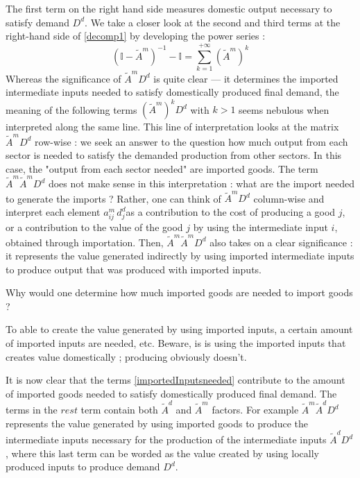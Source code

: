 \documentclass[12pt,english]{article}
\begin{document}
The first term on the right hand side measures domestic output necessary to satisfy demand $D^d$. We take a closer look at the second and third terms at the right-hand side of  \ref{decomp1} by developing the power series : 
\begin{equation}
(\mathbb{I} - \tilde{A}^m)^{-1} - \mathbb{I} = \sum_{k=1}^{+\infty}  (\tilde{A}^m)^k  \label{importedInputsneeded}
\end{equation}
Whereas the significance of $\tilde{A}^m D^d$ is quite clear --- it determines the imported intermediate inputs needed to satisfy domestically produced final demand, the meaning of the following terms $(\tilde{A}^m)^k D^d$ with $k>1$ seems nebulous when interpreted along the same line. This line of interpretation looks at the matrix $\tilde{A}^m D^d$ row-wise : we seek an answer to the question how much output from each sector is needed to satisfy the demanded production from other sectors. In this case, the "output from each sector needed" are imported goods. The term $\tilde{A}^m \tilde{A}^m D^d$ does not make sense in this interpretation : what are the import needed to generate the imports ? Rather, one can think of $\tilde{A}^m D^d$ column-wise and interpret each element $a^m_{ij}\,d^d_j$as a contribution to the cost of producing a good $j$, or a contribution to the value of the good $j$ by using the intermediate input $i$, obtained through importation. Then, $\tilde{A}^m \tilde{A}^m D^d$ also takes on a clear significance : it represents the value generated indirectly by using imported intermediate inputs to %
produce output that was produced with imported inputs. 

Why would one determine how much imported goods are needed to import goods ? 

To able to create the value generated by using imported inputs, a certain amount of imported inputs are needed, etc.
Beware, is is using the imported inputs that creates value domestically ; producing obviously doesn't.

It is now clear that the terms \ref{importedInputsneeded} contribute to the amount of imported goods needed to satisfy domestically produced final demand. The terms in the $rest$ term contain both $\tilde{A}^d$ and $\tilde{A}^m$ factors. For example $\tilde{A}^m \tilde{A}^d D^d$ represents the value generated by using imported goods to produce the intermediate inputs necessary for the production of the intermediate inputs $\tilde{A}^d D^d$, where this last term can be worded as the value created by using locally produced inputs to produce demand $D^d$.
\end{document}
